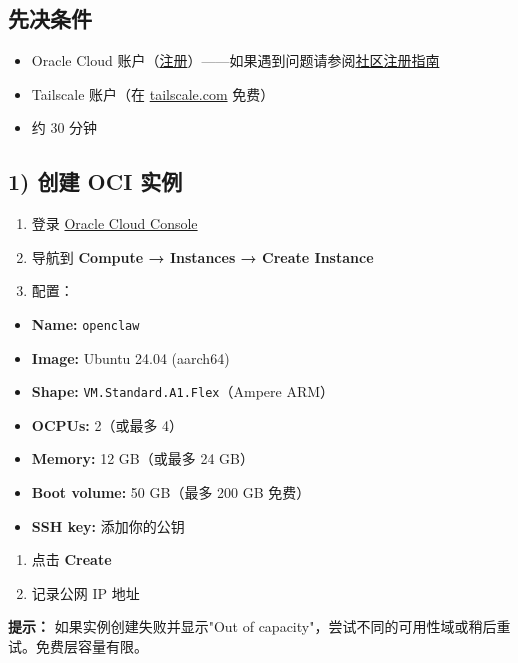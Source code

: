 \hrulefill


\subsection{先决条件}


\begin{itemize}
  \item Oracle Cloud 账户（\href{https://www.oracle.com/cloud/free/}{注册}）——如果遇到问题请参阅\href{https://gist.github.com/rssnyder/51e3cfedd730e7dd5f4a816143b25dbd}{社区注册指南}
  \item Tailscale 账户（在 \href{https://tailscale.com}{tailscale.com} 免费）
  \item 约 30 分钟
\end{itemize}


\subsection{1) 创建 OCI 实例}


\begin{enumerate}
  \item 登录 \href{https://cloud.oracle.com/}{Oracle Cloud Console}
  \item 导航到 \textbf{Compute → Instances → Create Instance}
  \item 配置：
\end{enumerate}

\begin{itemize}
  \item \textbf{Name:} \texttt{openclaw}
  \item \textbf{Image:} Ubuntu 24.04 (aarch64)
  \item \textbf{Shape:} \texttt{VM.Standard.A1.Flex}（Ampere ARM）
  \item \textbf{OCPUs:} 2（或最多 4）
  \item \textbf{Memory:} 12 GB（或最多 24 GB）
  \item \textbf{Boot volume:} 50 GB（最多 200 GB 免费）
  \item \textbf{SSH key:} 添加你的公钥
\end{itemize}

\begin{enumerate}
  \item 点击 \textbf{Create}
  \item 记录公网 IP 地址
\end{enumerate}


\textbf{提示：} 如果实例创建失败并显示"Out of capacity"，尝试不同的可用性域或稍后重试。免费层容量有限。

